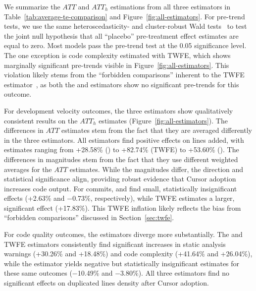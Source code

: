 We summarize the $ATT$ and $ATT_h$ estimations from all three estimators in Table~\ref{tab:average-te-comparison} and Figure~\ref{fig:all-estimators}. 
For pre-trend tests, we use the same heteroscedasticity- and cluster-robust Wald tests~\citep{borusyak2024revisiting} to test the joint null hypothesis that all ``placebo'' pre-treatment effect estimates are equal to zero.
Most models pass the pre-trend test at the 0.05 significance level. 
The one exception is code complexity estimated with TWFE, which shows marginally significant pre-trends visible in Figure~\ref{fig:all-estimators}. This violation likely stems from the ``forbidden comparisons'' inherent to the TWFE estimator~\citep{dechaisemartin2020two}, as both the \citet{borusyak2024revisiting} and \citet{callaway2021difference} estimators show no significant pre-trends for this outcome.

For development velocity outcomes, the three estimators show qualitatively consistent results on the $ATT_h$ estimates (Figure~\ref{fig:all-estimators}).
The differences in $ATT$ estimates stem from the fact that they are averaged differently in the three estimators.
All estimators find positive effects on lines added, with estimates ranging from +28.58\% (\citet{borusyak2024revisiting}) to +82.74\% (TWFE) to +53.60\% (\citet{callaway2021difference}).
The differences in magnitudes stem from the fact that they use different weighted averages for the $ATT$ estimates.
While the magnitudes differ, the direction and statistical significance align, providing robust evidence that Cursor adoption increases code output. For commits, \citet{borusyak2024revisiting} and \citet{callaway2021difference} find small, statistically insignificant effects (+2.63\% and $-$0.73\%, respectively), while TWFE estimates a larger, significant effect (+17.83\%). This TWFE inflation likely reflects the bias from ``forbidden comparisons'' discussed in Section~\ref{sec:twfe}.

For code quality outcomes, the estimators diverge more substantially. The \citet{borusyak2024revisiting} and TWFE estimators consistently find significant increases in static analysis warnings (+30.26\% and +18.48\%) and code complexity (+41.64\% and +26.04\%), while the \citet{callaway2021difference} estimator yields negative but statistically insignificant estimates for these same outcomes ($-$10.49\% and $-$3.80\%). 
All three estimators find no significant effects on duplicated lines density after Cursor adoption.

